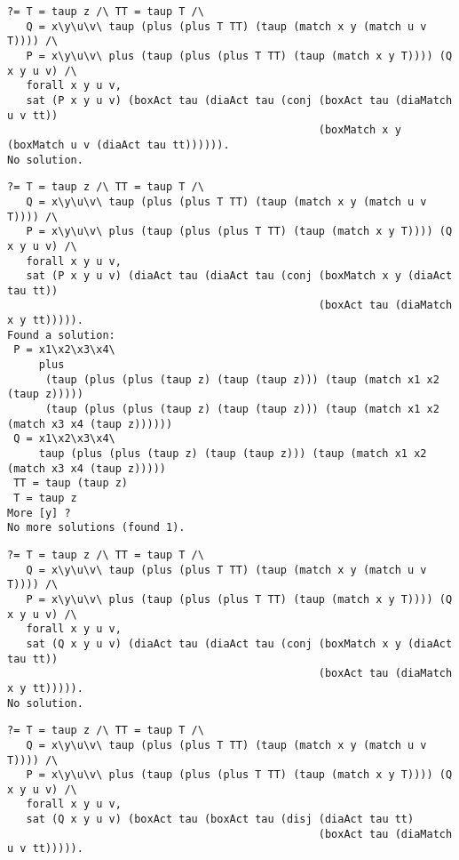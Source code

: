 \documentclass{article}
\renewcommand{\vDash}{\models}
\newcommand{\ttt}{\mathtt{t\hspace*{-.25em}t}}
\newcommand{\boxm}[1]{\mathopen{\big[ #1 \big]}} %
\newcommand{\diam}[1]{\mathopen{\big\langle #1 \big\rangle}}
\begin{document}
{{{{{{{\begin{verbatim}
?= T = taup z /\ TT = taup T /\
   Q = x\y\u\v\ taup (plus (plus T TT) (taup (match x y (match u v T)))) /\ 
   P = x\y\u\v\ plus (taup (plus (plus T TT) (taup (match x y T)))) (Q x y u v) /\ 
   forall x y u v,
   sat (P x y u v) (boxAct tau (diaAct tau (conj (boxAct tau (diaMatch u v tt))
                                                 (boxMatch x y (boxMatch u v (diaAct tau tt)))))).
No solution.
\end{verbatim}}
%
\fbox{$
P \vDash
\mathopen{\diam{\tau}\diam{\tau}}\big(\boxm{x=y}\diam{\tau}\ttt \wedge \boxm{\tau}\diam{x=y}\ttt\big)
$}
{\small%
\begin{verbatim}
?= T = taup z /\ TT = taup T /\
   Q = x\y\u\v\ taup (plus (plus T TT) (taup (match x y (match u v T)))) /\
   P = x\y\u\v\ plus (taup (plus (plus T TT) (taup (match x y T)))) (Q x y u v) /\
   forall x y u v,
   sat (P x y u v) (diaAct tau (diaAct tau (conj (boxMatch x y (diaAct tau tt)) 
                                                 (boxAct tau (diaMatch x y tt))))).
Found a solution:
 P = x1\x2\x3\x4\
     plus
      (taup (plus (plus (taup z) (taup (taup z))) (taup (match x1 x2 (taup z)))))
      (taup (plus (plus (taup z) (taup (taup z))) (taup (match x1 x2 (match x3 x4 (taup z))))))
 Q = x1\x2\x3\x4\
     taup (plus (plus (taup z) (taup (taup z))) (taup (match x1 x2 (match x3 x4 (taup z)))))
 TT = taup (taup z)
 T = taup z
More [y] ? 
No more solutions (found 1).
\end{verbatim}}
%
\fbox{$
Q \not\vDash
\mathopen{\diam{\tau}\diam{\tau}}\big(\boxm{x=y}\diam{\tau}\ttt \wedge \boxm{\tau}\diam{x=y}\ttt\big)
$}
{\small%
\begin{verbatim}
?= T = taup z /\ TT = taup T /\
   Q = x\y\u\v\ taup (plus (plus T TT) (taup (match x y (match u v T)))) /\ 
   P = x\y\u\v\ plus (taup (plus (plus T TT) (taup (match x y T)))) (Q x y u v) /\ 
   forall x y u v,
   sat (Q x y u v) (diaAct tau (diaAct tau (conj (boxMatch x y (diaAct tau tt)) 
                                                 (boxAct tau (diaMatch x y tt))))).
No solution.
\end{verbatim}}
%
\fbox{$
Q \vDash
\boxm{\tau}\boxm{\tau}\left(\diam{\tau}\ttt \vee \boxm{\tau}\diam{w=z}\ttt\right)
$}
{\small%
\begin{verbatim}
?= T = taup z /\ TT = taup T /\
   Q = x\y\u\v\ taup (plus (plus T TT) (taup (match x y (match u v T)))) /\
   P = x\y\u\v\ plus (taup (plus (plus T TT) (taup (match x y T)))) (Q x y u v) /\
   forall x y u v,
   sat (Q x y u v) (boxAct tau (boxAct tau (disj (diaAct tau tt)
                                                 (boxAct tau (diaMatch u v tt))))).

\end{verbatim}}}}}}}}
\end{document}
